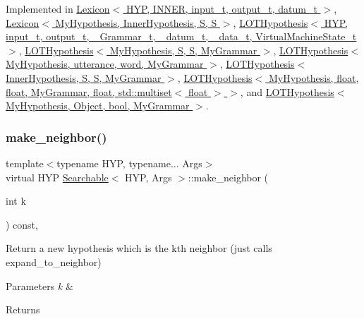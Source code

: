 Implemented in \hyperlink{class_lexicon_ab9fcefbd8598a5401a39bd59e8043db9}{Lexicon$<$ H\+Y\+P, I\+N\+N\+E\+R, input\+\_\+t, output\+\_\+t, datum\+\_\+t $>$}, \hyperlink{class_lexicon_ab9fcefbd8598a5401a39bd59e8043db9}{Lexicon$<$ My\+Hypothesis, Inner\+Hypothesis, S, S $>$}, \hyperlink{class_l_o_t_hypothesis_a9eeaaf321324d2418405f4d7252f6ca4}{L\+O\+T\+Hypothesis$<$ H\+Y\+P, input\+\_\+t, output\+\_\+t, \+\_\+\+Grammar\+\_\+t, \+\_\+datum\+\_\+t, \+\_\+data\+\_\+t, Virtual\+Machine\+State\+\_\+t $>$}, \hyperlink{class_l_o_t_hypothesis_a9eeaaf321324d2418405f4d7252f6ca4}{L\+O\+T\+Hypothesis$<$ My\+Hypothesis, S, S, My\+Grammar $>$}, \hyperlink{class_l_o_t_hypothesis_a9eeaaf321324d2418405f4d7252f6ca4}{L\+O\+T\+Hypothesis$<$ My\+Hypothesis, utterance, word, My\+Grammar $>$}, \hyperlink{class_l_o_t_hypothesis_a9eeaaf321324d2418405f4d7252f6ca4}{L\+O\+T\+Hypothesis$<$ Inner\+Hypothesis, S, S, My\+Grammar $>$}, \hyperlink{class_l_o_t_hypothesis_a9eeaaf321324d2418405f4d7252f6ca4}{L\+O\+T\+Hypothesis$<$ My\+Hypothesis, float, float, My\+Grammar, float, std\+::multiset$<$ float $>$ $>$}, and \hyperlink{class_l_o_t_hypothesis_a9eeaaf321324d2418405f4d7252f6ca4}{L\+O\+T\+Hypothesis$<$ My\+Hypothesis, Object, bool, My\+Grammar $>$}.

\mbox{\label{class_searchable_acd4cf198859084f7a656ef507e65a872}} 
\subsubsection{\texorpdfstring{make\+\_\+neighbor()}{make\_neighbor()}}
{\footnotesize\ttfamily template$<$typename H\+YP, typename... Args$>$ \\
virtual H\+YP \hyperlink{class_searchable}{Searchable}$<$ H\+YP, Args $>$\+::make\+\_\+neighbor (\begin{DoxyParamCaption}\item[{int}]{k }\end{DoxyParamCaption}) const\hspace{0.3cm}{\ttfamily [inline]}, {\ttfamily [virtual]}}



Return a new hypothesis which is the k\textquotesingle{}th neighbor (just calls expand\+\_\+to\+\_\+neighbor) 


\begin{DoxyParams}{Parameters}
{\em k} & \\
\hline
\end{DoxyParams}
\begin{DoxyReturn}{Returns}

\end{DoxyReturn}
\mbox{\label{class_searchable_abebbaaf94b0502a35d0ba686af73bd08}} 
